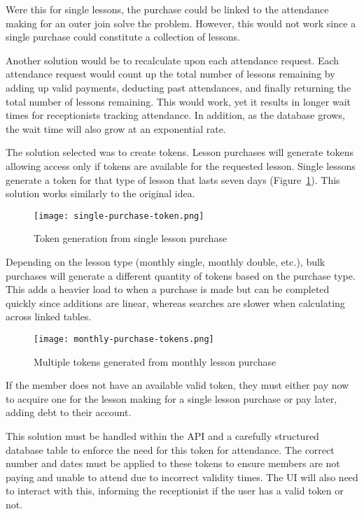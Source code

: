 Were this for single lessons, the purchase could be linked to the attendance making for an outer join solve the problem. However, this would not work since a single purchase could constitute a collection of lessons.

Another solution would be to recalculate upon each attendance request. Each attendance request would count up the total number of lessons remaining by adding up valid payments, deducting past attendances, and finally returning the total number of lessons remaining. This would work, yet it results in longer wait times for receptionists tracking attendance. In addition, as the database grows, the wait time will also grow at an exponential rate.

The solution selected was to create tokens. Lesson purchases will generate tokens allowing access only if tokens are available for the requested lesson. Single lessons generate a token for that type of lesson that lasts seven days (Figure~\ref{fig:single-token}). This solution works similarly to the original idea.

\begin{figure}[ht!]
    \centerline{\texttt{[image: single-purchase-token.png]}}
    \caption{Token generation from single lesson purchase}
    \label{fig:single-token}
\end{figure}

Depending on the lesson type (monthly single, monthly double, etc.), bulk purchases will generate a different quantity of tokens based on the purchase type. This adds a heavier load to when a purchase is made but can be completed quickly since additions are linear, whereas searches are slower when calculating across linked tables.

\begin{figure}[ht!]
    \centerline{\texttt{[image: monthly-purchase-tokens.png]}}
    \caption{Multiple tokens generated from monthly lesson purchase}
    \label{fig:multi-token}
\end{figure}

If the member does not have an available valid token, they must either pay now to acquire one for the lesson making for a single lesson purchase or pay later, adding debt to their account.

This solution must be handled within the API and a carefully structured database table to enforce the need for this token for attendance. The correct number and dates must be applied to these tokens to ensure members are not paying and unable to attend due to incorrect validity times. The UI will also need to interact with this, informing the receptionist if the user has a valid token or not.


